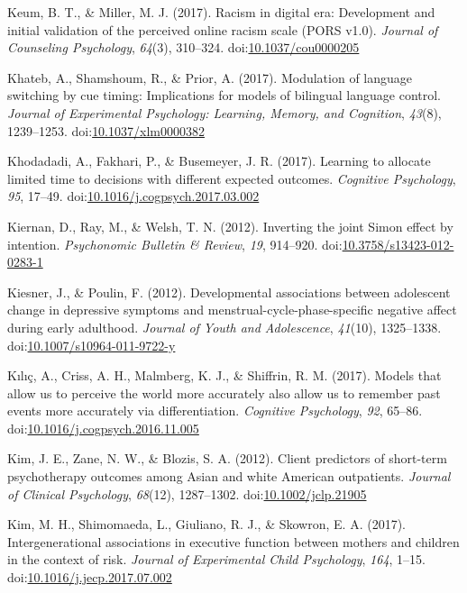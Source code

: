\documentclass[english,man]{apa6}
\theoremstyle{definition}
\theoremstyle{definition}
\theoremstyle{definition}
\theoremstyle{remark}
\begin{document}
\hypertarget{ref-Keum2017}{}
Keum, B. T., \& Miller, M. J. (2017). Racism in digital era: Development
and initial validation of the perceived online racism scale (PORS v1.0).
\emph{Journal of Counseling Psychology}, \emph{64}(3), 310--324.
doi:\href{https://doi.org/10.1037/cou0000205}{10.1037/cou0000205}

\hypertarget{ref-Khateb2017}{}
Khateb, A., Shamshoum, R., \& Prior, A. (2017). Modulation of language
switching by cue timing: Implications for models of bilingual language
control. \emph{Journal of Experimental Psychology: Learning, Memory, and
Cognition}, \emph{43}(8), 1239--1253.
doi:\href{https://doi.org/10.1037/xlm0000382}{10.1037/xlm0000382}

\hypertarget{ref-Khodadadi2017}{}
Khodadadi, A., Fakhari, P., \& Busemeyer, J. R. (2017). Learning to
allocate limited time to decisions with different expected outcomes.
\emph{Cognitive Psychology}, \emph{95}, 17--49.
doi:\href{https://doi.org/10.1016/j.cogpsych.2017.03.002}{10.1016/j.cogpsych.2017.03.002}

\hypertarget{ref-Kiernan2012}{}
Kiernan, D., Ray, M., \& Welsh, T. N. (2012). Inverting the joint Simon
effect by intention. \emph{Psychonomic Bulletin \& Review}, \emph{19},
914--920.
doi:\href{https://doi.org/10.3758/s13423-012-0283-1}{10.3758/s13423-012-0283-1}

\hypertarget{ref-Kiesner2012}{}
Kiesner, J., \& Poulin, F. (2012). Developmental associations between
adolescent change in depressive symptoms and
menstrual-cycle-phase-specific negative affect during early adulthood.
\emph{Journal of Youth and Adolescence}, \emph{41}(10), 1325--1338.
doi:\href{https://doi.org/10.1007/s10964-011-9722-y}{10.1007/s10964-011-9722-y}

\hypertarget{ref-Klc2017}{}
Kılıç, A., Criss, A. H., Malmberg, K. J., \& Shiffrin, R. M. (2017).
Models that allow us to perceive the world more accurately also allow us
to remember past events more accurately via differentiation.
\emph{Cognitive Psychology}, \emph{92}, 65--86.
doi:\href{https://doi.org/10.1016/j.cogpsych.2016.11.005}{10.1016/j.cogpsych.2016.11.005}

\hypertarget{ref-Kim2012}{}
Kim, J. E., Zane, N. W., \& Blozis, S. A. (2012). Client predictors of
short-term psychotherapy outcomes among Asian and white American
outpatients. \emph{Journal of Clinical Psychology}, \emph{68}(12),
1287--1302.
doi:\href{https://doi.org/10.1002/jclp.21905}{10.1002/jclp.21905}

\hypertarget{ref-Kim2017}{}
Kim, M. H., Shimomaeda, L., Giuliano, R. J., \& Skowron, E. A. (2017).
Intergenerational associations in executive function between mothers and
children in the context of risk. \emph{Journal of Experimental Child
Psychology}, \emph{164}, 1--15.
doi:\href{https://doi.org/10.1016/j.jecp.2017.07.002}{10.1016/j.jecp.2017.07.002}
\end{document}
